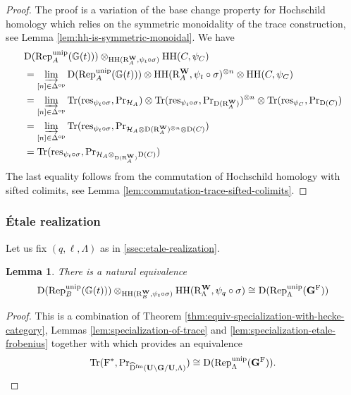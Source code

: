 \documentclass[a4paper, 10pt, oneside, reqno]{amsart}
\theoremstyle{plain}
\newtheorem{lem}[thm]{Lemma}
\theoremstyle{definition}
\theoremstyle{remark}
\newcommand{\Gbb}{\mathbb{G}}
\newcommand{\RR}{\mathrm{R}}
\newcommand{\opp}{\mathrm{op}}
\newcommand{\fm}{\mathrm{fm}}
\newcommand{\HHH}{\mathrm{HH}}
\newcommand{\Prr}{\mathrm{Pr}}
\newcommand{\restr}{\mathrm{res}}
\begin{document}
\begin{proof}
The proof is a variation of the base change property for Hochschild homology which relies on the symmetric monoidality of the trace construction, see Lemma \ref{lem:hh-is-symmetric-monoidal}. We have 
\begin{align*}
&\DD(\Rep_{A}^{\unip}(\Gbb(t))) \otimes_{\HHH(\RR_{A}^{\Wbf}, \psi_t \circ \sigma)}\HHH(C, \psi_C) \\
&= \varinjlim_{[n] \in \Delta^{\opp}} \DD(\Rep_{A}^{\unip}(\Gbb(t))) \otimes \HHH(\RR_{A}^{\Wbf}, \psi_t \circ \sigma)^{\otimes n} \otimes \HHH(C, \psi_C) \\
&= \varinjlim_{[n] \in \Delta^{\opp}} \Tr(\restr_{\psi_t \circ \sigma}, \Prr_{\Hcal_{A}}) \otimes \Tr(\restr_{\psi_t \circ \sigma}, \Prr_{\DD(\RR_A^{\Wbf})})^{\otimes n} \otimes \Tr(\restr_{\psi_C}, \Prr_{\DD(C)}) \\
&= \varinjlim_{[n] \in \Delta^{\opp}} \Tr(\restr_{\psi_t \circ \sigma}, \Prr_{\Hcal_{A} \otimes  \DD(\RR_A^{\Wbf})^{\otimes n} \otimes \DD(C)}) \\
&= \Tr(\restr_{\psi_t \circ \sigma}, \Prr_{\Hcal_{A} \otimes_{\DD(\RR_A^{\Wbf})} \DD(C)})
\end{align*}
The last equality follows from the commutation of Hochschild homology with sifted colimits, see Lemma \ref{lem:commutation-trace-sifted-colimits}.
\end{proof}

\subsubsection{\'{E}tale realization}

Let us fix $(q, \ell, \Lambda)$ as in \ref{ssec:etale-realization}.
\begin{lem}\label{lem:etale-realization}
There is a natural equivalence
$$\DD(\Rep_{B}^{\unip}(\Gbb(t))) \otimes_{\HHH(\RR_B^{\Wbf}, \psi_t \circ \sigma)} \HHH(\RR_{\Lambda}^{\Wbf}, \psi_q \circ \sigma) \cong \DD(\Rep^{\unip}_{\Lambda}(\Gbf^{\Frob}))$$
\end{lem}

\begin{proof}
This is a combination of Theorem \ref{thm:equiv-specialization-with-hecke-category}, Lemmas \ref{lem:specialization-of-trace} and  \ref{lem:specialization-etale-frobenius} together with \cite[Theorem 1.3.1]{EteveFreeMono} which provides an equivalence 
$$\Tr(\Frob^*, \Prr_{\widehat{\DD}^{\fm}(\Ubf \backslash \Gbf/\Ubf, \Lambda)}) \cong \DD(\Rep^{\unip}_{\Lambda}(\Gbf^{\Frob})).$$
\end{proof}
\end{document}
